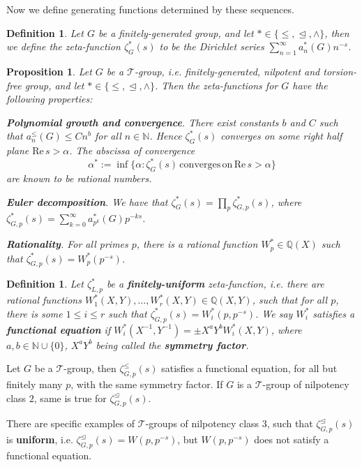 \documentclass[12pt]{article}
\newtheorem{proposition}[theorem]{Proposition}
\newtheorem{definition}[theorem]{Definition}
\begin{document}
Now we define generating functions determined by these sequences. 
\begin{definition}
\label{def:zeta.function}
Let $G$ be a finitely-generated group, and let $\ast\in\{\leq,\trianglelefteq,\wedge\}$, then we define the zeta-function $\zeta_{G}^{\ast}(s)$ to be the Dirichlet series $\sum_{n=1}^{\infty}a_{n}^{\ast}(G){n}^{-s}$. 
\end{definition}
\begin{proposition}
Let $G$ be a $\mathcal{T}$-group, i.e. finitely-generated, nilpotent and torsion-free group, and let $\ast\in\{\leq,\trianglelefteq,\wedge\}$. Then the zeta-functions for $G$ have the following properties:\par
\textbf{Polynomial growth and convergence}. There exist constants $b$ and $C$ such that $a_{n}^{\leq}(G)\leq{C}{n}^{b}$ for all $n\in\mathbb{N}$. Hence $\zeta_{G}^{\ast}(s)$ converges on some right half plane $\mathrm{Re}\,s>\alpha$. The abscissa of convergence \[\alpha^{\ast}:=\inf\{\alpha : \zeta_{G}^{\ast}(s)\,\mathrm{converges}\,\mathrm{on}\,\mathrm{Re}\,s>\alpha\}\] are known to be rational numbers.

\textbf{Euler decomposition}.
We have that $\zeta_{G}^{\ast}(s)=\prod_{p}\zeta_{G,p}^{\ast}(s)$, where $\zeta_{G,p}^{\ast}(s)=\sum_{k=0}^{\infty}a_{p^k}^{\ast}(G)p^{-ks}$.

\textbf{Rationality}. For all primes $p$, there is a rational function $W_{p}^{\ast}\in\mathbb{Q}(X)$ such that $\zeta_{G,p}^{\ast}(s)=W_{p}^{\ast}(p^{-s})$.
\end{proposition}
\begin{definition}
Let $\zeta_{L,p}^{\ast}$ be a \textbf{finitely-uniform} zeta-function, i.e. there are rational functions $W_{1}^{\ast}(X,Y),\dots,W_{r}^{\ast}(X,Y)\in\mathbb{Q}(X,Y)$, such that for all $p$, there is some $1\leq{i}\leq{r}$ such that $\zeta_{G,p}^{\ast}(s)=W_{i}^{\ast}(p,p^{-s})$. We say $W_{i}^{\ast}$ satisfies a \textbf{functional equation} if $W_{i}^{\ast}(X^{-1},Y^{-1})=\pm{X}^{a}{Y}^{b}{W_{i}^{\ast}(X,Y)}$, where $a,b\in\mathbb{N}\cup\{0\}$, $X^{a}Y^{b}$ being called the \textbf{symmetry factor}.    
\end{definition}
Let $G$ be a $\mathcal{T}$-group, then $\zeta_{G,p}^{\leq}(s)$ satisfies a functional equation, for all but finitely many $p$, with the same symmetry factor. If $G$ is a $\mathcal{T}$-group of nilpotency class $2$, same is true for $\zeta_{G,p}^{\trianglelefteq}(s)$.

There are specific examples of $\mathcal{T}$-groups of nilpotency class $3$, such that $\zeta_{G,p}^{\trianglelefteq}(s)$ is \textbf{uniform}, i.e. $\zeta_{G,p}^{\trianglelefteq}(s)=W(p,p^{-s})$, but $W(p,p^{-s})$ does not satisfy a functional equation.
\end{document}
